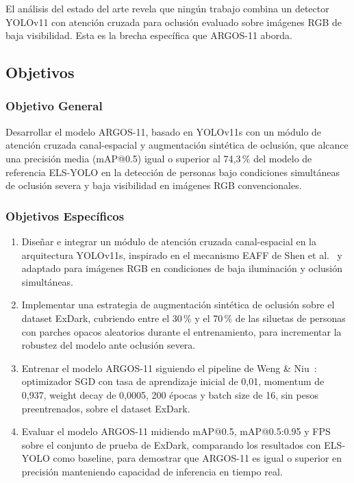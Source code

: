El an\'alisis del estado del arte revela que ning\'un trabajo
combina un detector YOLOv11 con atenci\'on cruzada para oclusi\'on
evaluado sobre im\'agenes RGB de baja visibilidad. Esta es la
brecha espec\'{i}fica que ARGOS-11 aborda.

\subsection{Objetivos}

\subsubsection{Objetivo General}

Desarrollar el modelo ARGOS-11, basado en YOLOv11s con un m\'odulo
de atenci\'on cruzada canal-espacial y augmentaci\'on sint\'etica
de oclusi\'on, que alcance una precisi\'on media (mAP@0.5) igual
o superior al 74{,}3\,\% del modelo de referencia ELS-YOLO en la
detecci\'on de personas bajo condiciones simult\'aneas de oclusi\'on
severa y baja visibilidad en im\'agenes RGB convencionales.

\subsubsection{Objetivos Espec\'{i}ficos}

\begin{enumerate}[label=OE\arabic*.]

\item Dise\~{n}ar e integrar un m\'odulo de atenci\'on cruzada
      canal-espacial en la arquitectura YOLOv11s, inspirado en el
      mecanismo EAFF de Shen et al.~\cite{Shen2025} y adaptado
      para im\'agenes RGB en condiciones de baja iluminaci\'on y
      oclusi\'on simult\'aneas.

\item Implementar una estrategia de augmentaci\'on sint\'etica de
      oclusi\'on sobre el dataset ExDark, cubriendo entre el 30\,\%
      y el 70\,\% de las siluetas de personas con parches opacos
      aleatorios durante el entrenamiento, para incrementar la
      robustez del modelo ante oclusi\'on severa.

\item Entrenar el modelo ARGOS-11 siguiendo el pipeline de Weng \&
      Niu~\cite{ElsYolo2025}: optimizador SGD con tasa de
      aprendizaje inicial de 0{,}01, momentum de 0{,}937, weight
      decay de 0{,}0005, 200 \'epocas y batch size de 16, sin pesos
      preentrenados, sobre el dataset ExDark.

\item Evaluar el modelo ARGOS-11 midiendo mAP@0.5, mAP@0.5:0.95 y
      FPS sobre el conjunto de prueba de ExDark, comparando los
      resultados con ELS-YOLO como baseline, para demostrar que
      ARGOS-11 es igual o superior en precisi\'on manteniendo
      capacidad de inferencia en tiempo real.

\end{enumerate}

